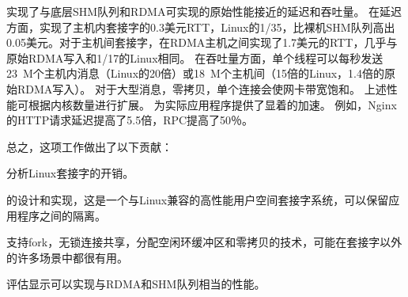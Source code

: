 
\sys {}实现了与底层SHM队列和RDMA可实现的原始性能接近的延迟和吞吐量。
在延迟方面，\sys {}实现了主机内套接字的0.3美元RTT，Linux的1/35，比裸机SHM队列高出0.05美元。对于主机间套接字，\sys {}在RDMA主机之间实现了1.7美元的RTT，几乎与原始RDMA写入和1/17的Linux相同。
在吞吐量方面，单个线程可以每秒发送23~M个主机内消息（Linux的20倍）或18~M个主机间（15倍的Linux，1.4倍的原始RDMA写入）。
对于大型消息，零拷贝，单个连接会使网卡带宽饱和。
上述性能可根据内核数量进行扩展。
\sys {}为实际应用程序提供了显着的加速。
例如，Nginx~ \cite {nginx}的HTTP请求延迟提高了5.5倍，RPC提高了50％。

总之，这项工作做出了以下贡献：
\begin{ecompact}
\item 分析Linux套接字的开销。
\item \sys {}的设计和实现，这是一个与Linux兼容的高性能用户空间套接字系统，可以保留应用程序之间的隔离。
\item 支持fork，无锁连接共享，分配空闲环缓冲区和零拷贝的技术，可能在套接字以外的许多场景中都很有用。
\item 评估显示\sys {}可以实现与RDMA和SHM队列相当的性能。
\end{ecompact}


